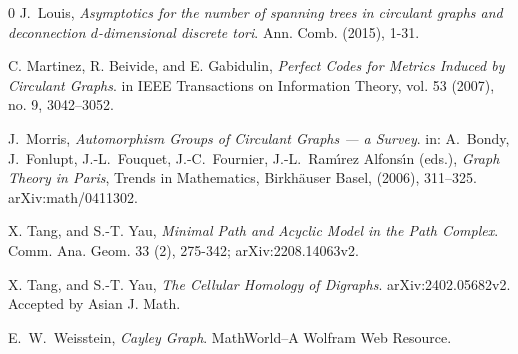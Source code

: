 \documentclass[11pt]{amsart}
\theoremstyle{plain}
\theoremstyle{definition}
\numberwithin{equation}{section}
\begin{document}
\begin{thebibliography}{0}
J.~Louis,
\textit{Asymptotics for the number of spanning trees in circulant graphs and deconnection $d$-dimensional discrete tori}.
Ann. Comb. (2015), 1-31.


 C. Martinez, R. Beivide, and E. Gabidulin,
\textit{Perfect Codes for Metrics Induced by Circulant Graphs}.
in IEEE Transactions on Information Theory, vol. 53 (2007), no. 9, 3042--3052.

J.~Morris,
\textit{Automorphism Groups of Circulant Graphs --- a Survey}.
in: A.~Bondy, J.~Fonlupt, J.-L.~Fouquet, J.-C.~Fournier, J.-L.~Ram\'{\i}rez Alfons\'{\i}n (eds.),
\textit{Graph Theory in Paris},
Trends in Mathematics, Birkh\"auser Basel, (2006), 311--325. arXiv:math/0411302.

 X. Tang, and S.-T. Yau,
\textit{Minimal Path and Acyclic Model in the Path Complex}.
Comm. Ana. Geom. 33 (2), 275-342; arXiv:2208.14063v2.


 X. Tang, and S.-T. Yau,
\textit{The Cellular Homology of Digraphs}.
arXiv:2402.05682v2. Accepted by Asian J. Math.



E.~W.~Weisstein,
\textit{Cayley Graph}. MathWorld--A Wolfram Web Resource.%


\end{thebibliography}
\end{document}
